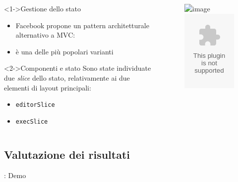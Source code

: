    \begin{frame}{\insertsectionhead}{\insertsubsectionhead}
      \begin{columns}
        \begin{column}{.5\textwidth}
          \begin{block}<1->{Gestione dello stato}
            \begin{itemize}
              \item
                Facebook propone un pattern architetturale alternativo a MVC:
              \item
                 è una delle più popolari varianti
            \end{itemize}
          \end{block}
          \begin{block}<2->{Componenti e stato}
            Sono state individuate due \emph{slice} dello stato, relativamente ai due elementi di layout principali:
            \begin{itemize}
              \item \texttt{editorSlice}
              \item \texttt{execSlice}
            \end{itemize}
          \end{block}
        \end{column}
        \begin{column}{.45\textwidth}
          \begin{figure}
            \includegraphics<1>[width=\textwidth]{../res/fig/redux-diagram.png}
            \includegraphics<2->[width=\textwidth]{res/uml/architecture-design-client.eps}
          \end{figure}
        \end{column}
      \end{columns}
    \end{frame}

  \subsection{Valutazione dei risultati}

    \begin{frame}{\insertsectionhead}{\insertsubsectionhead{}: Demo}
      \centering
    \end{frame}


